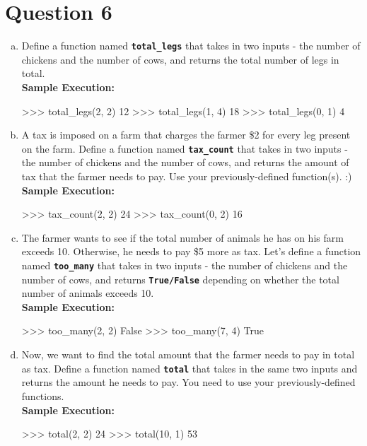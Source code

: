 \section{Question 6}
\begin{enumerate}[(a)]
  \item Define a function named \texttt{\bfseries total\_legs} that takes in two inputs - the number of chickens and the number of cows,
  and returns the total number of legs in total. \\
  \textbf{Sample Execution:}
  \begin{python}
    >>> total_legs(2, 2)
    12
    >>> total_legs(1, 4)
    18
    >>> total_legs(0, 1)
    4
  \end{python}

  \item A tax is imposed on a farm that charges the farmer \$2 for every leg present on the farm. Define a function named
  \texttt{\bfseries tax\_count} that takes in two inputs - the number of chickens and the number of cows, and returns the amount of tax that
  the farmer needs to pay. Use your previously-defined function(s). :) \\
  \textbf{Sample Execution:}
  \begin{python}
    >>> tax_count(2, 2)
    24
    >>> tax_count(0, 2)
    16
  \end{python}
  
  \item The farmer wants to see if the total number of animals he has on his farm exceeds 10. Otherwise, he needs to pay \$5
  more as tax. Let’s define a function named \texttt{\bfseries too\_many} that takes in two inputs - the number of chickens and the number of cows,
  and returns \texttt{\bfseries True/False} depending on whether the total number of animals exceeds 10. \\
  \textbf{Sample Execution:}
  \begin{python}
    >>> too_many(2, 2)
    False
    >>> too_many(7, 4)
    True
  \end{python}

  \item Now, we want to find the total amount that the farmer needs to pay in total as tax. Define a function named \texttt{\bfseries total}
  that takes in the same two inputs and returns the amount he needs to pay. You need to use your previously-defined functions. \\
  \textbf{Sample Execution:}
  \begin{python}
    >>> total(2, 2)
    24
    >>> total(10, 1)
    53
  \end{python}
\end{enumerate}

